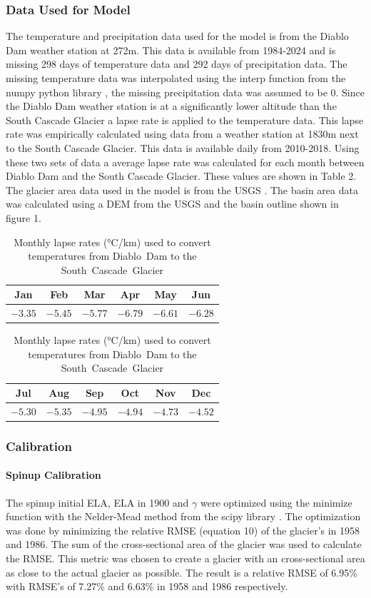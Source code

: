 \documentclass{article}
\begin{document}
\subsubsection{Data Used for Model}
The temperature and precipitation data used for the model is from the Diablo Dam weather station at 272m. This data is available from 1984-2024 
and is missing 298 days of temperature data and 292 days of precipitation data. The missing temperature data was interpolated 
using the interp function from the numpy python library \cite{ref7}, the missing precipitation data was assumed to be 0. Since the Diablo Dam
weather station is at a significantly lower altitude than the South Cascade Glacier a lapse rate is applied to the temperature data. This lapse 
rate was empirically calculated using data from a weather station at 1830m next to the South Cascade Glacier. This data is available daily from 
2010-2018. Using these two sets of data a average lapse rate was calculated for each month between Diablo Dam and the South Cascade Glacier. 
These values are shown in Table 2. The glacier area data used in 
the model is from the USGS \cite{ref8}. The basin area data was calculated using a DEM from the USGS and the basin outline shown in figure 1.

\begin{table}[h!]
  \centering
  \small
  \begin{tabular}{|*{6}{c|}}
    \hline
    Jan & Feb & Mar & Apr & May & Jun \\ 
    \hline
    $-3.35$ & $-5.45$ & $-5.77$ & $-6.79$ & $-6.61$ & $-6.28$ \\
    \hline
  \end{tabular}
  \begin{tabular}{|*{6}{c|}}
    \hline
    Jul & Aug & Sep & Oct & Nov & Dec \\ 
    \hline
    $-5.30$ & $-5.35$ & $-4.95$ & $-4.94$ & $-4.73$ & $-4.52$ \\
    \hline
  \end{tabular}
  \caption{Monthly lapse rates (°C/km) used to convert temperatures from \mbox{Diablo Dam} to the South Cascade Glacier}
  \label{tab:lapse_rates}
\end{table}

\subsubsection{Calibration} 
\paragraph{Spinup Calibration}
The spinup initial ELA, ELA in 1900 and $\gamma$ were optimized using the minimize function with the Nelder-Mead method from the scipy library \cite{ref9}.
The optimization was done by minimizing the relative RMSE (equation 10) of the glacier's in 1958 and 1986. The sum of the cross-sectional area of the glacier was used to calculate the RMSE. This metric was chosen to create a glacier with an cross-sectional area as close to the actual glacier as possible. 
The result is a relative RMSE of 6.95\% with RMSE's of 7.27\% and 6.63\% in 1958 and 1986 respectively.
\end{document}
